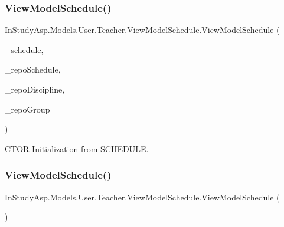 \subsubsection{\texorpdfstring{View\+Model\+Schedule()}{ViewModelSchedule()}\hspace{0.1cm}{\footnotesize\ttfamily [1/2]}}
{\footnotesize\ttfamily In\+Study\+Asp.\+Models.\+User.\+Teacher.\+View\+Model\+Schedule.\+View\+Model\+Schedule (\begin{DoxyParamCaption}\item[{\hyperlink{class_e_f_oracle_1_1_model_1_1_s_c_h_e_d_u_l_e}{S\+C\+H\+E\+D\+U\+LE}}]{\+\_\+schedule,  }\item[{\hyperlink{interface_repo_1_1_common_1_1_i_generic_repository}{I\+Generic\+Repository}$<$ \hyperlink{class_e_f_oracle_1_1_model_1_1_s_c_h_e_d_u_l_e}{S\+C\+H\+E\+D\+U\+LE} $>$}]{\+\_\+repo\+Schedule,  }\item[{\hyperlink{interface_repo_1_1_common_1_1_i_generic_repository}{I\+Generic\+Repository}$<$ \hyperlink{class_e_f_oracle_1_1_model_1_1_d_i_s_c_i_p_l_i_n_e}{D\+I\+S\+C\+I\+P\+L\+I\+NE} $>$}]{\+\_\+repo\+Discipline,  }\item[{\hyperlink{interface_repo_1_1_common_1_1_i_generic_repository}{I\+Generic\+Repository}$<$ \hyperlink{class_e_f_oracle_1_1_model_1_1_g_r_o_u_p}{G\+R\+O\+UP} $>$}]{\+\_\+repo\+Group }\end{DoxyParamCaption})}



C\+T\+OR Initialization from S\+C\+H\+E\+D\+U\+LE. 

\mbox{\label{class_in_study_asp_1_1_models_1_1_user_1_1_teacher_1_1_view_model_schedule_aedd00ac53d0f727aa23665f21bf2db92}} 
\subsubsection{\texorpdfstring{View\+Model\+Schedule()}{ViewModelSchedule()}\hspace{0.1cm}{\footnotesize\ttfamily [2/2]}}
{\footnotesize\ttfamily In\+Study\+Asp.\+Models.\+User.\+Teacher.\+View\+Model\+Schedule.\+View\+Model\+Schedule (\begin{DoxyParamCaption}{ }\end{DoxyParamCaption})}



